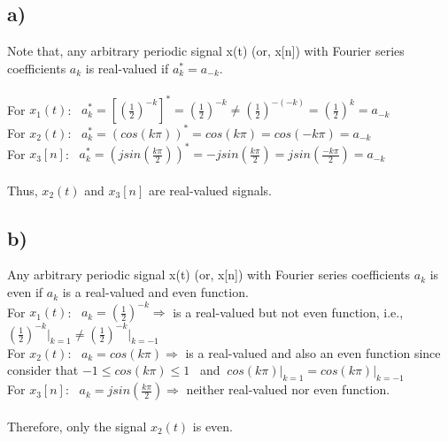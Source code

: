 \documentclass[12pt]{article}
\begin{document}
    \subsection*{a)}
    Note that, any arbitrary periodic signal x(t) (or, x[n]) with Fourier series coefficients \(a_k\) is real-valued if  \(a^{*}_k = a_{-k}\). \\ \\
    For \(x_1(t)\): \ 
    \begin{math}
     a^{*}_k =  [(\frac{1}{2})^{-k}]^{*} = (\frac{1}{2})^{-k} \neq (\frac{1}{2})^{-(-k)}  = (\frac{1}{2})^{k} = a_{-k} \end{math} \\
    For \(x_2(t)\): \ 
    \begin{math}
     a^{*}_k =  (cos(k\pi))^{*} = cos(k\pi) = cos(-k\pi) = a_{-k} \end{math} \\
    For \(x_3[n]\): \ 
    \begin{math}
     a^{*}_k =  (jsin(\frac{k\pi}{2}))^{*} = -jsin(\frac{k\pi}{2})= jsin(\frac{-k\pi}{2}) = a_{-k} \end{math} \\ \\
    Thus, \(x_2(t)\) and \(x_3[n]\) are real-valued signals.
      
    \subsection*{b)}
    Any arbitrary periodic signal x(t) (or, x[n]) with Fourier series coefficients \(a_k\) is even if \(a_k\) is a real-valued and even function.\\
    For \(x_1(t)\): \ 
    \begin{math}
     a_k =  (\frac{1}{2})^{-k}  \Rightarrow \end{math} is a real-valued but not even function, i.e., \begin{math} (\frac{1}{2})^{-k} \Big|_{k=1} \neq (\frac{1}{2})^{-k} \Big|_{k=-1} \end{math}\\
    For \(x_2(t)\): \ 
    \begin{math}
     a_k =  cos(k\pi) \Rightarrow \end{math} is a real-valued and also an even function since consider that \begin{math} -1\leq cos(k\pi) \leq 1 \end{math} \ and \begin{math}\ cos(k\pi)\Big|_{k=1} = cos(k\pi)\Big|_{k=-1}\end{math} \\
    For \(x_3[n]\): \ 
    \begin{math}
     a_k =  jsin(\frac{k\pi}{2}) \Rightarrow  \end{math} neither real-valued nor even function. \\ \\
    Therefore, only the signal \(x_2(t)\) is even. 
      
\end{document}
